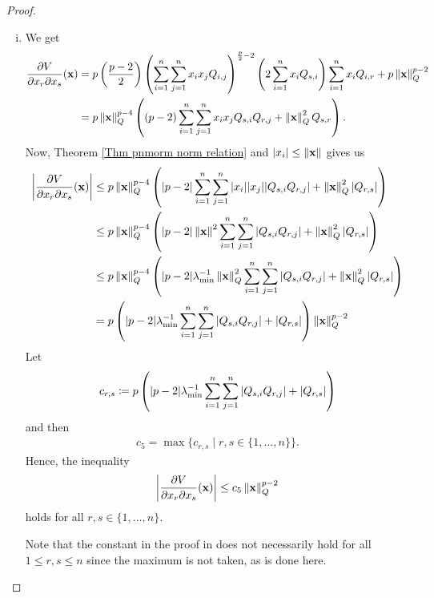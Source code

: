 \documentclass[a4paper,12pt,twoside,BCOR=10mm]{scrbook}
\begin{document}
\begin{proof}
\begin{enumerate}[i)]
    \item We get
    \begin{align*}
        \frac{\partial V}{\partial x_r \partial x_s}(\mathbf{x}) &= p\left(\frac{p - 2}{2}\right)\left (\sum_{i = 1}^n\sum_{j = 1}^n x_ix_j Q_{i,j} \right)^{\frac{p}{2} - 2} \left(2 \sum_{i = 1}^n x_i Q_{s,i}\right)\sum_{i = 1}^n x_i Q_{i,r} + p\left\lVert\mathbf{x}\right\rVert_{Q}^{p-2}\\
        &= p\left\lVert\mathbf{x}\right\rVert_{Q}^{p-4}\left( (p-2)\sum\limits_{i = 1}^n\sum\limits_{j = 1}^n x_i x_j Q_{s,i}Q_{r,j} + \left\lVert\mathbf{x}\right\rVert_{Q}^{2}Q_{s,r}\right).
    \end{align*}
    Now, Theorem \ref{Thm pnmorm norm relation} and $|x_i| \leq \left\lVert\mathbf{x}\right\rVert$ gives us
    \begin{align*}
        \left | \frac{\partial V}{\partial x_r \partial x_s}(\mathbf{x}) \right | &\leq p\left\lVert\mathbf{x}\right\rVert_{Q}^{p-4}\left(|p-2| \sum\limits_{i = 1}^n\sum\limits_{j = 1}^n |x_i||x_j||Q_{s,i}Q_{r,j}| + \left\lVert\mathbf{x}\right\rVert_{Q}^{2}|Q_{r,s}|\right)\\
        &\leq p\left\lVert\mathbf{x}\right\rVert_{Q}^{p-4}\left(|p-2| \left\lVert\mathbf{x}\right\rVert^2 \sum\limits_{i = 1}^n\sum\limits_{j = 1}^n|Q_{s,i}Q_{r,j}| + \left\lVert\mathbf{x}\right\rVert_{Q}^{2}|Q_{r,s}| \right)\\
        &\leq p\left\lVert\mathbf{x}\right\rVert_{Q}^{p-4}\left(|p-2| \lambda_{\min}^{-1}\left\lVert\mathbf{x}\right\rVert_{Q}^{2} \sum\limits_{i = 1}^n\sum\limits_{j = 1}^n|Q_{s,i}Q_{r,j}| + \left\lVert\mathbf{x}\right\rVert_{Q}^{2}|Q_{r,s}| \right)\\
        &= p\left(|p-2|\lambda_{\min}^{-1} \sum\limits_{i = 1}^n\sum\limits_{j = 1}^n|Q_{s,i}Q_{r,j}| + |Q_{r,s}| \right)\left\lVert\mathbf{x}\right\rVert_{Q}^{p-2}
    \end{align*}
    Let
    \begin{align*}
        c_{r,s} \coloneqq p\left(|p-2|\lambda_{\min}^{-1} \sum\limits_{i = 1}^n\sum\limits_{j = 1}^n|Q_{s,i}Q_{r,j}| + |Q_{r,s}| \right)
    \end{align*}
    and then
    \begin{align*}
        c_5 = \max\{c_{r,s} \mid r,s\in\{1,\ldots, n\}\}.
    \end{align*}
    Hence, the inequality
    \begin{align*}
        \left| \frac{\partial V}{\partial x_r\partial x_s}(\mathbf{x})\right| \leq c_5 \left\lVert\mathbf{x}\right\rVert_{Q}^{p-2}
    \end{align*}
    holds for all $r,s \in \{1,\ldots, n\}$.
    
    Note that the constant in the proof in \citep{Ha2019BMI} does not necessarily hold for all $1\leq r,s \leq n$ since the maximum is not taken, as is done here.
\end{enumerate}
\end{proof}
\end{document}
